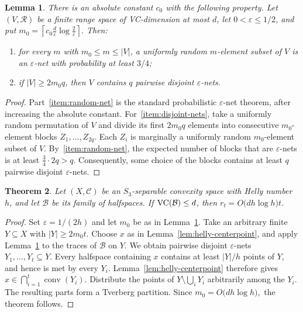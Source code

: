 \documentclass[11pt]{article}
\newtheorem{thm}{Theorem}[section]%
\newtheorem{lem}[thm]{Lemma}
\theoremstyle{definition}
\newcommand{\C}{\mathcal{C}}
\newcommand{\B}{\mathcal{B}}
\newcommand{\conv}{\operatorname{conv}}
\newcommand{\VC}{\textup{VC}}
\begin{document}
\begin{lem}
\label{lem:disjoint-epsilon-nets}
There is an absolute constant $c_0$ with the following property.
Let $(V,\mathcal R)$ be a finite range space of VC-dimension at most
$d$, let $0<\varepsilon\le 1/2$, and put
$m_0=
\left\lceil
c_0\frac d\varepsilon\log\frac{2}{\varepsilon}
\right\rceil.$
Then:
\begin{enumerate}
    \item\label{item:random-net}
    for every $m$ with $m_0\le m\le |V|$, a uniformly random
    $m$-element subset of $V$ is an $\varepsilon$-net with probability
    at least $3/4$;
    \item\label{item:disjoint-nets}
    if $|V|\ge 2m_0q$, then $V$ contains $q$ pairwise disjoint
    $\varepsilon$-nets.
\end{enumerate}
\end{lem}

\begin{proof}
Part~\ref{item:random-net} is the standard probabilistic
$\varepsilon$-net theorem, after increasing the absolute constant.
For~\ref{item:disjoint-nets}, take a uniformly random permutation of
$V$ and divide its first $2m_0q$ elements into consecutive
$m_0$-element blocks
$Z_1,\ldots,Z_{2q}.$
Each $Z_i$ is marginally a uniformly random $m_0$-element subset of
$V$.  By~\ref{item:random-net}, the expected number of blocks that are
$\varepsilon$-nets is at least
$\frac34\cdot 2q>q.$
Consequently, some choice of the blocks contains at least $q$
pairwise disjoint $\varepsilon$-nets.
\end{proof}

\begin{thm}\label{thm:Helly-VC-Tverberg}
Let $(X,\C)$ be an $S_3$-separable convexity space with Helly number
$h$, and let $\B$ be its family of halfspaces.  If $\VC(\B)\le d$,
then
$r_t=O\bigl(dh\log h\bigr)t.$
\end{thm}

\begin{proof}
Set $\varepsilon=1/(2h)$ and let $m_0$ be as in
Lemma~\ref{lem:disjoint-epsilon-nets}.  Take an arbitrary finite
$Y\subseteq X$ with
$|Y|\ge 2m_0t.$
Choose $x$ as in Lemma~\ref{lem:helly-centerpoint}, and apply
Lemma~\ref{lem:disjoint-epsilon-nets} to the traces of $\B$ on $Y$.
We obtain pairwise disjoint $\varepsilon$-nets
$Y_1,\ldots,Y_t\subseteq Y.$
Every halfspace containing $x$ contains at least $|Y|/h$ points of
$Y$, and hence is met by every $Y_i$. 
Lemma~\ref{lem:helly-centerpoint} therefore gives
$x\in\bigcap_{i=1}^t\conv(Y_i).$
Distribute the points of $Y\setminus\bigcup_iY_i$ arbitrarily among
the $Y_i$.  The resulting parts form a Tverberg partition.  Since
$m_0=O\bigl(dh\log h\bigr),$
the theorem follows.
\end{proof}
\end{document}
